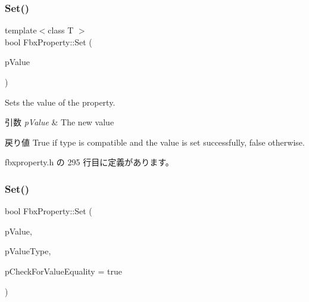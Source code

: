 \subsubsection{\texorpdfstring{Set()}{Set()}\hspace{0.1cm}{\footnotesize\ttfamily [1/2]}}
{\footnotesize\ttfamily template$<$class T $>$ \\
bool Fbx\+Property\+::\+Set (\begin{DoxyParamCaption}\item[{const T \&}]{p\+Value }\end{DoxyParamCaption})\hspace{0.3cm}{\ttfamily [inline]}}

Sets the value of the property. 
\begin{DoxyParams}{引数}
{\em p\+Value} & The new value \\
\hline
\end{DoxyParams}
\begin{DoxyReturn}{戻り値}
{\ttfamily True} if type is compatible and the value is set successfully, {\ttfamily false} otherwise. 
\end{DoxyReturn}


 fbxproperty.\+h の 295 行目に定義があります。

\mbox{\label{class_fbx_property_aa89d91b8bf335921748ea21ab08eb9a3}} 
\subsubsection{\texorpdfstring{Set()}{Set()}\hspace{0.1cm}{\footnotesize\ttfamily [2/2]}}
{\footnotesize\ttfamily bool Fbx\+Property\+::\+Set (\begin{DoxyParamCaption}\item[{const void $\ast$}]{p\+Value,  }\item[{const \hyperlink{fbxpropertytypes_8h_a73913a5ddfb20e57c6f25e9e6784bd92}{E\+Fbx\+Type} \&}]{p\+Value\+Type,  }\item[{bool}]{p\+Check\+For\+Value\+Equality = {\ttfamily true} }\end{DoxyParamCaption})\hspace{0.3cm}{\ttfamily [protected]}}

\mbox{\label{class_fbx_property_ae9dd7a699742397756227ac1dbd9eb13}} 
